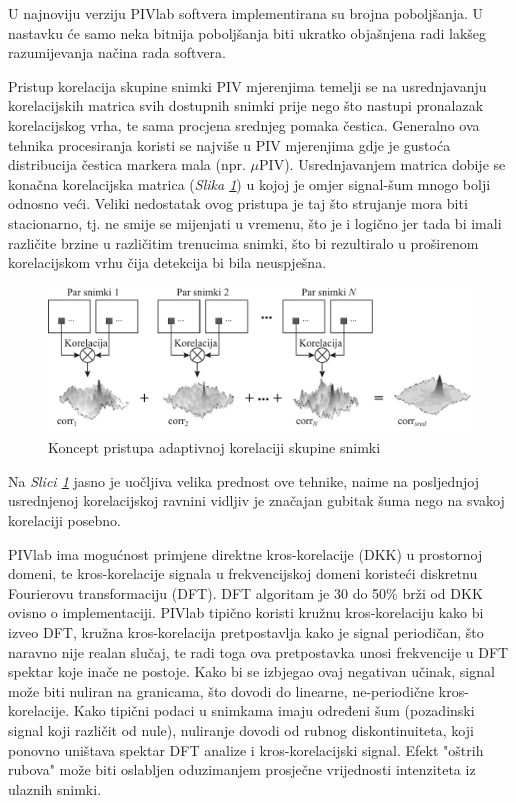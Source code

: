 \par
U najnoviju verziju PIVlab softvera implementirana su brojna poboljšanja. U nastavku će samo neka bitnija poboljšanja biti ukratko objašnjena radi lakšeg razumijevanja načina rada softvera.
\begin{description}[style=unboxed,leftmargin=0cm]
	\item[Korelacija skupine snimki (\textit{eng. ensemble correlation})] Pristup korelacija skupine snimki PIV mjerenjima temelji se na usrednjavanju korelacijskih matrica svih dostupnih snimki prije nego što nastupi pronalazak korelacijskog vrha, te sama procjena srednjeg pomaka čestica. Generalno ova tehnika procesiranja koristi se najviše u PIV mjerenjima gdje je gustoća distribucija čestica markera mala (npr. $\mu$PIV). Usrednjavanjem matrica dobije se konačna korelacijska matrica (\textit{Slika \ref{sl:5.2}}) u kojoj je omjer signal-šum mnogo bolji odnosno veći. Veliki nedostatak ovog pristupa je taj što strujanje mora biti stacionarno, tj. ne smije se mijenjati u vremenu, što je i logično jer tada bi imali različite brzine u različitim trenucima snimki, što bi rezultiralo u proširenom korelacijskom vrhu čija detekcija bi bila neuspješna.
	\begin{figure}[H]  
		\centering
		\includegraphics[width=16cm]{./5_PIVlab/slika5_2.pdf} 
		\caption{Koncept pristupa adaptivnoj korelaciji skupine snimki \cite{willert2008ensemble}}
		\label{sl:5.2}
	\end{figure}
	Na \textit{Slici \ref{sl:5.2}} jasno je uočljiva velika prednost ove tehnike, naime na posljednjoj usrednjenoj korelacijskoj ravnini vidljiv je značajan gubitak šuma nego na svakoj korelaciji posebno.
	\item[Poboljšanje korelacijskoj algoritma - kružna i linearna korelacija] PIVlab ima mogućnost primjene direktne kros-korelacije (DKK) u prostornoj domeni, te kros-korelacije signala u frekvencijskoj domeni koristeći diskretnu Fourierovu transformaciju (DFT). DFT algoritam je 30 do 50\% brži od DKK ovisno o implementaciji. PIVlab tipično koristi kružnu kros-korelaciju kako bi izveo DFT, kružna kros-korelacija pretpostavlja kako je signal periodičan, što naravno nije realan slučaj, te radi toga ova pretpostavka unosi frekvencije u DFT spektar koje inače ne postoje\cite{raffel2018_book}. Kako bi se izbjegao ovaj negativan učinak, signal može biti nuliran na granicama, što dovodi do linearne, ne-periodične kros-korelacije. Kako tipični podaci u snimkama imaju određeni šum (pozadinski signal koji različit od nule), nuliranje dovodi od rubnog diskontinuiteta, koji ponovno uništava spektar DFT analize i kros-korelacijski signal. Efekt "oštrih rubova" može biti oslabljen oduzimanjem prosječne vrijednosti intenziteta iz ulaznih snimki.

\end{description}
